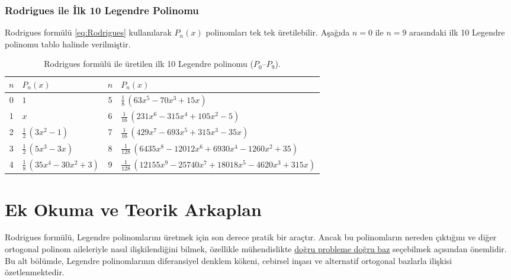 \subsubsection{Rodrigues ile İlk 10 Legendre Polinomu}

Rodrigues formülü \eqref{eq:Rodrigues} kullanılarak $P_n(x)$ polinomları
tek tek üretilebilir. Aşağıda $n=0$ ile $n=9$ arasındaki ilk 10 Legendre polinomu
tablo halinde verilmiştir.

\begin{table}[h]
\centering
\renewcommand{\arraystretch}{1.5}
\setlength{\tabcolsep}{12pt}
\begin{tabular}{c l c l}
\toprule
\textbf{$n$} & \textbf{$P_n(x)$} & \textbf{$n$} & \textbf{$P_n(x)$} \\
\midrule
0 & $1$
& 5 & $\frac{1}{8}\,(63x^5-70x^3+15x)$ \\[6pt]

1 & $x$
& 6 & $\frac{1}{16}\,(231x^6-315x^4+105x^2-5)$ \\[6pt]

2 & $\frac{1}{2}\,(3x^2-1)$
& 7 & $\frac{1}{16}\,(429x^7-693x^5+315x^3-35x)$ \\[6pt]

3 & $\frac{1}{2}\,(5x^3-3x)$
& 8 & $\frac{1}{128}\,(6435x^8-12012x^6+6930x^4-1260x^2+35)$ \\[8pt]

4 & $\frac{1}{8}\,(35x^4-30x^2+3)$
& 9 & $\frac{1}{128}\,(12155x^9-25740x^7+18018x^5-4620x^3+315x)$ \\
\bottomrule
\end{tabular}
\caption{Rodrigues formülü ile üretilen ilk 10 Legendre polinomu ($P_0$--$P_9$).}
\label{tab:first10_legendre}
\end{table}



\newpage
\section{Ek Okuma ve Teorik Arkaplan}
\label{subsec:ek_okuma_alternatifler}

Rodrigues formülü, Legendre polinomlarını üretmek için son derece pratik bir araçtır. Ancak bu polinomların nereden çıktığını ve diğer ortogonal polinom aileleriyle nasıl ilişkilendiğini bilmek, özellikle mühendislikte \uline{doğru probleme doğru baz} seçebilmek açısından önemlidir. Bu alt bölümde, Legendre polinomlarının diferansiyel denklem kökeni, cebirsel inşası ve alternatif ortogonal bazlarla ilişkisi özetlenmektedir.

